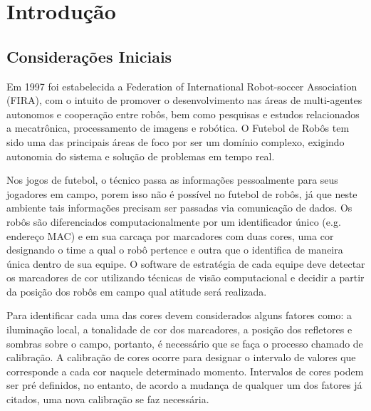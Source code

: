 \chapter{Introdução} \label{Cap:Introducao}
\section{Considerações Iniciais}
Em 1997 foi estabelecida a Federation of International Robot-soccer Association (FIRA), com o intuito de promover o desenvolvimento nas áreas de multi-agentes autonomos e cooperação entre robôs, bem como pesquisas e estudos relacionados a mecatrônica, processamento de imagens e robótica\cite{FiraHistory,FiraOverview}. O Futebol de Robôs tem sido  uma das principais áreas de foco por ser um domínio complexo, exigindo autonomia do sistema e solução de problemas em tempo real\cite{Costa:2000,Faria2006}. 

Nos jogos de futebol, o técnico passa as informações pessoalmente para seus jogadores em campo, porem isso não é possível no futebol de robôs, já que neste ambiente tais informações precisam ser passadas via comunicação de dados.%
Os robôs são diferenciados computacionalmente por um identificador único (e.g. endereço MAC) e em sua carcaça por marcadores com duas cores, uma cor designando o time a qual o robô pertence e outra que o identifica de maneira única dentro de sua equipe. O software de estratégia de cada equipe deve detectar os marcadores de cor utilizando técnicas de visão computacional e decidir a partir da posição dos robôs em campo qual atitude será realizada.

Para identificar cada uma das cores devem considerados alguns fatores como: a iluminação local, a tonalidade de cor dos marcadores, a posição dos refletores e sombras sobre o campo, portanto, é necessário que se faça o processo chamado de calibração. A calibração de cores ocorre para designar o intervalo de valores que corresponde a cada cor naquele determinado momento. Intervalos de cores podem ser pré definidos, no entanto, de acordo a mudança de qualquer um dos fatores já citados, uma nova calibração se faz necessária.

